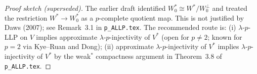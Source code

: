 \documentclass{article}
\begin{document}
\begin{proof}[Proof sketch (superseded)]
The earlier draft identified $W_0^*\cong W^*/W_0^\perp$ and treated the
restriction $W^*\to W_0^*$ as a $p$-complete quotient map.  This is not justified
by Daws (2007); see Remark~3.1 in \texttt{p\_ALLP.tex}.
The recommended route is: (i) $\lambda$-$p$-LLP on $V$ implies approximate
$\lambda$-$p$-injectivity of $V^*$ (open for $p\neq 2$; known for $p=2$ via
Kye--Ruan and Dong); (ii) approximate $\lambda$-$p$-injectivity of $V^*$ implies
$\lambda$-$p$-injectivity of $V^*$ by the weak$^*$ compactness argument in
Theorem~3.8 of \texttt{p\_ALLP.tex}.
\end{proof}
\end{document}
